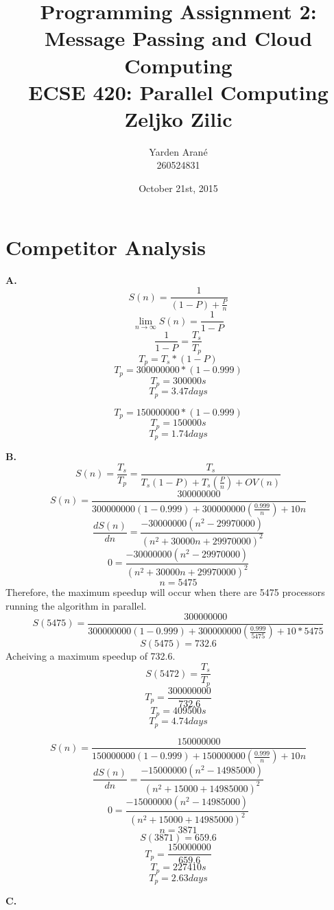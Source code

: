 \documentclass[11pt, a4paper]{article}
\begin{document}
\title{Programming Assignment 2:\\
	Message Passing and Cloud Computing\\
	ECSE 420: Parallel Computing\\
	Zeljko Zilic}
\author{Yarden Aran\'{e}\\
	260524831\\}
\date {October 21st, 2015}
\maketitle

\break

\section[20]{Competitor Analysis}

\textbf{A.} 
$$S(n) = \frac{1}{(1-P)+\frac{P}{n}}$$
$$\lim_{n\to\infty} S(n) = \frac{1}{1-P}$$ 
$$\frac{1}{1-P} = \frac{T_s}{T_p}$$
$$T_p = T_s * (1-P)$$
$$T_p = 300000000*(1-0.999)$$
$$T_p = 300000 s$$
$$T_p = 3.47 days$$

$$T_p = 150000000*(1-0.999)$$
$$T_p = 150000 s$$
$$T_p = 1.74 days$$

\textbf{B.}
$$S(n) = \frac{T_s}{T_p} = \frac{T_s}{T_s(1-P)+T_s(\frac{P}{n})+OV(n)}$$
$$S(n) = \frac{300000000}{300000000(1-0.999)+300000000(\frac{0.999}{n})+10n}$$
$$\frac{dS(n)}{dn} = \frac{-30000000(n^2-29970000)}{(n^2+30000n+29970000)^2}$$
$$0 = \frac{-30000000(n^2-29970000)}{(n^2+30000n+29970000)^2}$$
$$n = 5475$$
Therefore, the maximum speedup will occur when there are 5475 processors running the algorithm in parallel.
$$S(5475) = \frac{300000000}{300000000(1-0.999)+300000000(\frac{0.999}{5475})+10*5475}$$
$$S(5475) = 732.6$$
Acheiving a maximum speedup of 732.6.
$$S(5472) = \frac{T_s}{T_p}$$
$$T_p = \frac{300000000}{732.6}$$
$$T_p = 409500 s$$
$$T_p = 4.74 days$$

$$S(n) = \frac{150000000}{150000000(1-0.999)+150000000(\frac{0.999}{n})+10n}$$
$$\frac{dS(n)}{dn} = \frac{-15000000(n^2-14985000)}{(n^2+15000+14985000)^2}$$
$$0 = \frac{-15000000(n^2-14985000)}{(n^2+15000+14985000)^2}$$
$$n = 3871$$
$$S(3871) = 659.6$$
$$T_p = \frac{150000000}{659.6}$$
$$T_p = 227410 s$$
$$T_p = 2.63 days$$

\textbf{C.}

\end{document}
